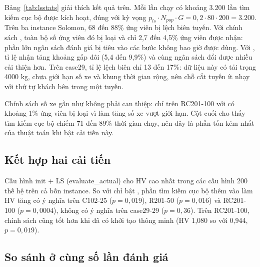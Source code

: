 \begin{table}[H]
\centering
\caption{Thống kê tìm kiếm cục bộ (trung bình một lần chạy 200 thế hệ; tỉ lệ tính trên số ứng viên)}
\label{tab:lsstats}
\resizebox{\textwidth}{!}{}
\end{table}

Bảng~\ref{tab:lsstats} giải thích kết quả trên. Mỗi lần chạy có khoảng 3.200 lần tìm kiếm cục bộ được
kích hoạt, đúng với kỳ vọng $p_{ls} \cdot N_{pop} \cdot G = 0{,}2 \cdot 80 \cdot 200 = 3.200$. Trên ba
instance Solomon, 68 đến 88\% ứng viên bị lệch biên tuyến. Với chính sách , toàn bộ số ứng
viên đó bị loại và chỉ 2,7 đến 4,5\% ứng viên được nhận: phần lớn ngân sách đánh giá bị tiêu vào các
bước không bao giờ được dùng. Với , tỉ lệ nhận tăng khoảng gấp đôi (5,4 đến 9,9\%)
và cùng ngân sách đổi được nhiều cải thiện hơn. Trên case29, tỉ lệ lệch biên chỉ 13 đến 17\%: dữ liệu này
có tải trọng 4000 kg, chưa giới hạn số xe và khung thời gian rộng, nên chỗ cắt tuyến ít nhạy với thứ tự
khách bên trong một tuyến.

Chính sách số xe gần như không phải can thiệp: chỉ trên RC201-100 với  có khoảng
1\% ứng viên bị loại vì làm tăng số xe vượt giới hạn. Cột cuối cho thấy tìm kiếm cục bộ chiếm 71 đến 89\%
thời gian chạy, nên đây là phần tốn kém nhất của thuật toán khi bật cải tiến này.

\subsection{Kết hợp hai cải tiến}

Cấu hình init + LS (evaluate\_actual) cho HV cao nhất trong các cấu hình 200 thế hệ trên cả bốn instance.
So với chỉ bật , phần tìm kiếm cục bộ thêm vào làm HV tăng có ý nghĩa trên C102-25
($p = 0{,}019$), R201-50 ($p = 0{,}016$) và RC201-100 ($p = 0{,}0004$), không có ý nghĩa trên case29-29
($p = 0{,}36$). Trên RC201-100, chính sách  cũng tốt hơn  khi đã có
khởi tạo thông minh (HV 1,080 so với 0,944, $p = 0{,}019$).

\subsection{So sánh ở cùng số lần đánh giá}

